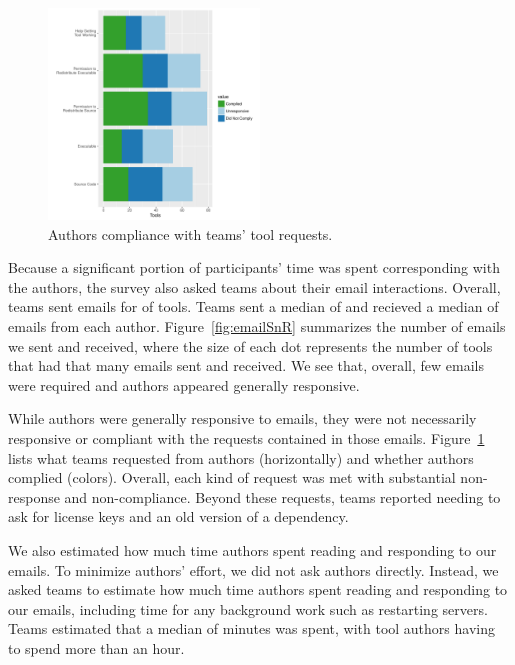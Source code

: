 \documentclass{sig-alternate-05-2015}
\begin{document}
\begin{figure}[!ht]
  \centering
    \includegraphics[width=0.5\textwidth]{requestPlot.pdf}
  \caption{Authors compliance with teams' tool requests.}\label{fig:requests}
\end{figure}

Because a significant portion of participants' time was
spent corresponding with the authors,
the survey also asked teams about their email interactions.
Overall, teams sent emails for \emailsPercentSent of tools.
Teams sent a median of \emailsSent and recieved 
a median of \emailsRecieved emails from each author.
Figure~\ref{fig:emailSnR} summarizes the number of emails
we sent and received, where the size of each dot
represents the number of tools that had
that many emails sent and received.
We see that, overall, few emails were required
and authors appeared generally responsive.

While authors were generally responsive to emails,
they were not necessarily responsive or compliant 
with the requests contained in those emails.
Figure~\ref{fig:requests} lists what teams requested from authors
(horizontally) and whether authors complied (colors).
Overall, each kind of request was met with substantial non-response and
non-compliance.
Beyond these requests, teams reported needing to ask for 
license keys and
an old version of a dependency.



We also estimated how much
time authors spent reading and responding to our emails.
To minimize authors' effort, we did not ask authors directly.
Instead, we asked teams to estimate how much time authors spent 
reading and responding to our emails, including time for 
any background work such as restarting servers.
Teams estimated that a median of \durationAuthorResponse minutes 
was spent, with \durationAuthorResponseCountHigh tool authors having
to spend more than an hour.
\end{document}
